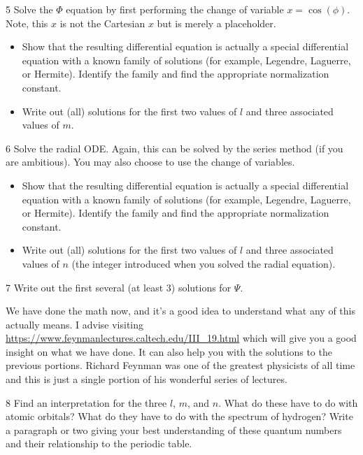 \documentclass{article}
\begin{document}
\begin{problem}{}{5}
Solve the $\Phi$ equation by first performing the change of variable $x=\cos(\phi)$. Note, this $x$ is not the Cartesian $x$ but is merely a placeholder.  
\begin{itemize}
    \item Show that the resulting differential equation is actually a special differential equation with a known family of solutions (for example, Legendre, Laguerre, or Hermite). Identify the family and find the appropriate normalization constant.
    \item Write out (all) solutions for the first two values of $l$ and three associated values of $m$.
\end{itemize}
\end{problem}

\begin{problem}{}{6}
Solve the radial ODE. Again, this can be solved by the series method (if you are ambitious).  You may also choose to use the change of variables.
\begin{itemize}
    \item Show that the resulting differential equation is actually a special differential equation with a known family of solutions (for example, Legendre, Laguerre, or Hermite). Identify the family and find the appropriate normalization constant.
    \item Write out (all) solutions for the first two values of $l$ and three associated values of $n$ (the integer introduced when you solved the radial equation).  
\end{itemize}
\end{problem}

\begin{problem}{}{7}
Write out the first several (at least 3) solutions for $\Psi$.
\end{problem}

\noindent We have done the math now, and it's a good idea to understand what any of this actually means.  I advise visiting \url{https://www.feynmanlectures.caltech.edu/III_19.html} which will give you a good insight on what we have done.  It can also help you with the solutions to the previous portions.  Richard Feynman was one of the greatest physicists of all time and this is just a single portion of his wonderful series of lectures.

\begin{problem}{}{8}
Find an interpretation for the three  $l$, $m$, and $n$.  What do these have to do with atomic orbitals? What do they have to do with the spectrum of hydrogen? Write a paragraph or two giving your best understanding of these quantum numbers and their relationship to the periodic table.
\end{problem}
\end{document}
